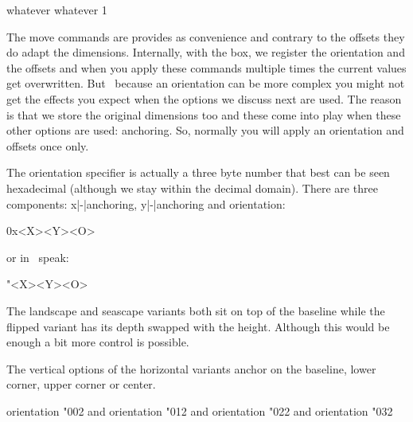 \typebuffer[option=TEX]

\startlinecorrection
{}
\stoplinecorrection

\startbuffer
\setbox\scratchboxone\hbox{whatever}%
\setbox\scratchboxtwo\hbox{whatever}%
1 \boxxoffset \scratchboxone -15pt \copy{} \boxyoffset \scratchboxone -15pt \copy{} \boxxoffset \scratchboxone -15pt \copy{} \boxyoffset \scratchboxone -15pt \copy{} \boxxmove   \scratchboxtwo -15pt \copy{} \boxymove   \scratchboxtwo -15pt \copy{} \boxxmove   \scratchboxtwo -15pt \copy{} \boxymove   \scratchboxtwo -15pt \copy\scratchboxtwo
\stopbuffer

\typebuffer[option=TEX]

\startlinecorrection
{}
\stoplinecorrection

The move commands are provides as convenience and contrary to the offsets they do
adapt the dimensions. Internally, with the box, we register the orientation and
the offsets and when you apply these commands multiple times the current values
get overwritten. But \unknown\ because an orientation can be more complex you
might not get the effects you expect when the options we discuss next are used.
The reason is that we store the original dimensions too and these come into play
when these other options are used: anchoring. So, normally you will apply an
orientation and offsets once only.


The orientation specifier is actually a three byte number that best can be seen
hexadecimal (although we stay within the decimal domain). There are three
components: x|-|anchoring, y|-|anchoring and orientation:

\starttyping
0x<X><Y><O>
\stoptyping

or in \TEX\ speak:

\starttyping
"<X><Y><O>
\stoptyping

The landscape and seascape variants both sit on top of the baseline while the
flipped variant has its depth swapped with the height. Although this would be
enough a bit more control is possible.

The vertical options of the horizontal variants anchor on the baseline, lower
corner, upper corner or center.

\startbuffer
{} orientation "002 {\TEX} and
 orientation "012 {\TEX} and
 orientation "022 {\TEX} and
 orientation "032 {\TEX}
\stopbuffer

